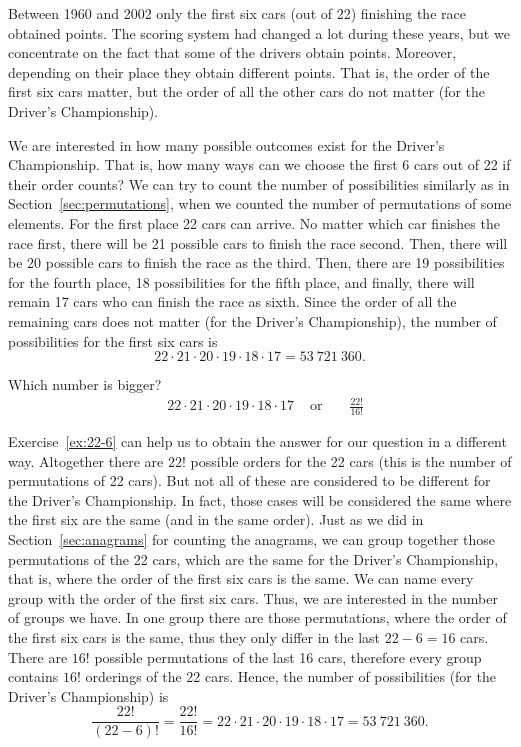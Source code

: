 Between 1960 and 2002 only the first six cars (out of 22) finishing the race obtained points. 
The scoring system had changed a lot during these years, 
but we concentrate on the fact that some of the drivers obtain points. 
Moreover, 
depending on their place they obtain different points. 
That is, the order of the first six cars matter, 
but the order of all the other cars do not matter (for the Driver's Championship). 

We are interested in how many possible outcomes exist for the Driver's Championship. 
That is, 
how many ways can we choose the first 6 cars out of 22 if their order counts? 
We can try to count the number of possibilities similarly as in Section~\ref{sec:permutations}, 
when we counted the number of permutations of some elements. 
For the first place 22 cars can arrive. 
No matter which car finishes the race first, 
there will be 21 possible cars to finish the race second. 
Then, there will be 20 possible cars to finish the race as the third. 
Then, there are 19 possibilities for the fourth place, 
18 possibilities for the fifth place, 
and finally, 
there will remain 17 cars who can finish the race as sixth. 
Since the order of all the remaining cars does not matter (for the Driver's Championship), 
the number of possibilities for the first six cars is
\[
22\cdot 21 \cdot 20 \cdot 19 \cdot 18 \cdot 17 = 53~721~360.
\]

\begin{exercise}\label{ex:22-6}
Which number is bigger? 
\begin{align*}
&22\cdot 21 \cdot 20 \cdot 19 \cdot 18 \cdot 17 &\text{ or }& &\frac{22!}{16!} 
\end{align*}
\end{exercise}

Exercise~\ref{ex:22-6} can help us to obtain the answer for our question in a different way. 
Altogether there are $22!$ possible orders for the 22 cars (this is the number of permutations of 22 cars). 
But not all of these are considered to be different for the Driver's Championship. 
In fact, those cases will be considered the same where the first six are the same (and in the same order). 
Just as we did in Section~\ref{sec:anagrams} for counting the anagrams, 
we can group together those permutations of the 22 cars, 
which are the same for the Driver's Championship, 
that is, where the order of the first six cars is the same. 
We can name every group with the order of the first six cars. 
Thus, we are interested in the number of groups we have. 
In one group there are those permutations, 
where the order of the first six cars is the same, 
thus they only differ in the last $22-6 = 16$ cars. 
There are $16!$ possible permutations of the last 16 cars, 
therefore every group contains $16!$ orderings of the 22 cars. 
Hence, 
the number of possibilities (for the Driver's Championship) is
\[
\frac{22!}{(22-6)!} = \frac{22!}{16!} = 22 \cdot 21 \cdot 20 \cdot 19 \cdot 18 \cdot 17 = 53~721~360.
\]

